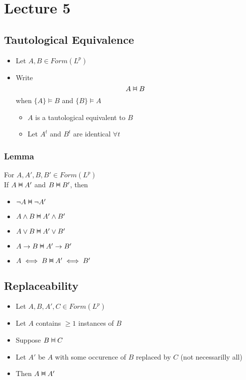 \documentclass[11pt]{article}
\newcommand{\vDashv}{%
  \mathrel{%
    \text{%
      \ooalign{$\vDash$\cr\reflectbox{$\vDash$}\cr}%
    }%
  }%
}
\begin{document}
\section{Lecture 5}
\subsection{Tautological Equivalence}
\begin{itemize}
    \item Let $A,B\in Form(L^p)$
    \item Write \[A\vDashv B\] when $\{A\}\vDash B$ and $\{B\}\vDash A$
    \begin{itemize}
        \item $A$ is a tautological equivalent to $B$
        \item Let $A^t$ and $B^t$ are identical $\forall t$
    \end{itemize}
\end{itemize}
\subsubsection{Lemma}
For $A,A',B,B'\in Form(L^p)$ \\
If $A\vDashv A'$ and $B\vDashv B'$, then 
\begin{itemize}
    \item $\neg A\vDashv \neg A'$
    \item $A\land B\vDashv A'\land B'$
    \item $A\lor B\vDashv A'\lor B'$
    \item $A\rightarrow B\vDashv A'\rightarrow B'$
    \item $A\iff B\vDashv A'\iff B'$
\end{itemize}
\subsection{Replaceability}
\begin{itemize}
    \item Let $A,B,A',C\in Form(L^p)$
    \item Let $A$ contains $\geq 1$ instances of $B$
    \item Suppose $B\vDashv C$
    \item Let $A'$ be $A$ with some occurence of $B$ replaced by $C$ (not necessarilly all)
    \item Then $A\vDashv A'$
\end{itemize}
\end{document}
